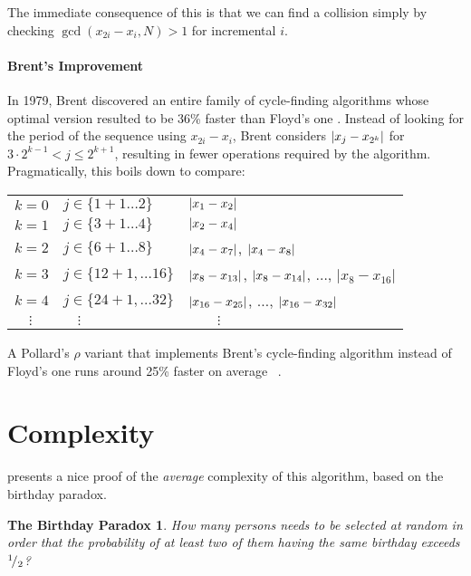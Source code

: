 The immediate consequence of this is that we can find a collision simply by
checking $\gcd(x_{2i} - x_i, N) > 1$ for incremental $i$.

\paragraph{Brent's Improvement} In 1979, Brent discovered an entire family of
cycle-finding algorithms whose optimal version resulted to be 36\% faster than
Floyd's one \cite{pollard-brent}.
Instead of looking for the period of the sequence using $x_{2i} - x_i$, Brent
considers
$\left|x_j - x_{2^k}\right|$ for $ 3 \cdot 2^{k-1} < j \leq 2^{k+1}$, resulting in
fewer operations required by the algorithm. Pragmatically, this boils down to
compare:

\medskip
\begin{tabular}{l@{\hskip 40pt} l@{\hskip 50pt} l}
  $k = 0$ & $j \in \{1+1 \ldots 2\}$ & $\left|x_1 - x_2\right|$ \\
  $k = 1$ & $j \in \{3+1 \ldots 4\}$ & $\left|x_2 - x_4\right|$ \\
  $k = 2$ & $j \in \{6+1 \ldots 8\}$ & $\left|x_4 - x_7\right|$, $\left|x_4 - x_8\right|$ \\
  $k = 3$ & $j \in \{12+1, \ldots 16\}$ &
            $\left|x_8 - x_{13}\right|$, $\left|x_8 -x_{14}\right|$, $\ldots$, $|x_8 - x_{16}|$\\
  $k = 4$ & $j \in \{24+1, \ldots 32 \}$ &
            $\left|x_{16} - x_{25}\right|$, $\ldots$, $\left|x_{16} - x_{32}\right|$ \\[2pt]
  $\quad \vdots$ & $\quad \vdots$ & $\quad \quad \vdots$ \\
\end{tabular}


A Pollard's $\rho$ variant that implements Brent's cycle-finding algorithm
instead of Floyd's one runs around 25\% faster on average
~\cite{pollard-brent}.

\section{Complexity}
\cite{riesel} presents a nice proof of the \emph{average} complexity of
this algorithm, based on the birthday paradox.
\newtheorem*{birthday}{The Birthday Paradox}
\begin{birthday}
  How many persons needs to be selected at random in order that the probability
  of at least two of them having the same birthday exceeds ${}^{1}\!/_{2}$?
\end{birthday}


